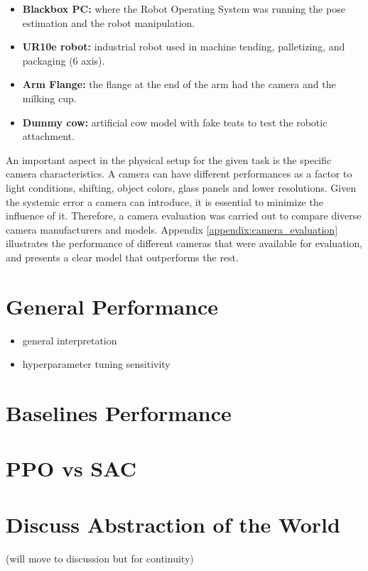     \begin{itemize}
        \item \textbf{Blackbox PC:} where the Robot Operating System was running the pose estimation and the robot manipulation.
        \item \textbf{UR10e robot:} industrial robot used in machine tending, palletizing, and packaging (6 axis).
        \item \textbf{Arm Flange:} the flange at the end of the arm had the camera and the milking cup.
        \item \textbf{Dummy cow:} artificial cow model with fake teats to test the robotic attachment.
    \end{itemize}
   
    
    An important aspect in the physical setup for the given task is the specific camera characteristics. A camera can have different performances as a factor to light conditions, shifting, object colors, glass panels and lower resolutions. Given the systemic error a camera can introduce, it is essential to minimize the influence of it. Therefore, a camera evaluation was carried out to compare diverse camera manufacturers and models. Appendix \ref{appendix:camera_evaluation} illustrates the performance of different cameras that were available for evaluation, and presents a clear model that outperforms the rest. 


\section{General Performance}
\begin{itemize}
    \item general interpretation
    \item hyperparameter tuning sensitivity
\end{itemize}

\section{Baselines Performance}


\section{PPO vs SAC}


\section{Discuss Abstraction of the World} (will move to discussion but for continuity)


